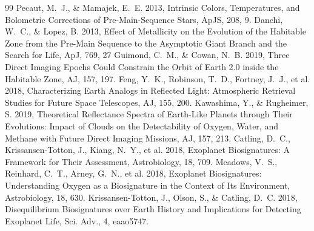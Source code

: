 \begin{thebibliography}{99}
 Pecaut, M.~J., \& Mamajek, E.~E.
2013, Intrinsic Colors, Temperatures, and Bolometric Corrections of
Pre-Main-Sequence Stars, ApJS, 208, 9.
Danchi, W.~C., \& Lopez, B. 2013,
Effect of Metallicity on the Evolution of the Habitable Zone from the
Pre-Main Sequence to the Asymptotic Giant Branch and the Search for Life,
ApJ, 769, 27
Guimond, C.~M., \& Cowan, N.~B. 2019,
Three Direct Imaging Epochs Could Constrain the Orbit of Earth 2.0
inside the Habitable Zone,
AJ, 157, 197.
Feng, Y.~K., Robinson, T.~D., Fortney, J.~J., et al. 2018,
Characterizing Earth Analogs in Reflected Light:
Atmospheric Retrieval Studies for Future Space Telescopes,
AJ, 155, 200.
Kawashima, Y., \& Rugheimer, S. 2019,
Theoretical Reflectance Spectra of Earth-Like Planets through Their
Evolutions: Impact of Clouds on the Detectability of Oxygen, Water,
and Methane with Future Direct Imaging Missions,
AJ, 157, 213.
Catling, D.~C., Krissansen-Totton, J., Kiang, N.~Y., et al. 2018,
Exoplanet Biosignatures: A Framework for Their Assessment,
Astrobiology, 18, 709.
Meadows, V.~S., Reinhard, C.~T., Arney, G.~N., et al. 2018,
Exoplanet Biosignatures: Understanding Oxygen as a Biosignature
in the Context of Its Environment,
Astrobiology, 18, 630.
Krissansen-Totton, J., Olson, S., \& Catling, D.~C. 2018,
Disequilibrium Biosignatures over Earth History and Implications
for Detecting Exoplanet Life,
Sci. Adv., 4, eaao5747.


\end{thebibliography}
